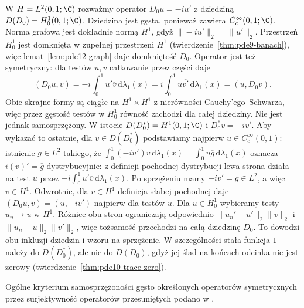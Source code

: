 \begin{przyklad}
\label{ex:pde12-derivative}
W $H=L^2(0,1;\C)$ rozważmy operator $D_0u=-iu'$ z dziedziną
$D(D_0)=H_0^1(0,1;\C)$. Dziedzina jest gęsta, ponieważ
zawiera $C_c^\infty(0,1;\C)$. Norma grafowa jest dokładnie
normą $H^1$, gdyż $\|-iu'\|_2=\|u'\|_2$.
Przestrzeń $H_0^1$ jest domknięta w zupełnej przestrzeni
$H^1$ (twierdzenie~\ref{thm:pde9-banach}), więc
lemat~\ref{lem:pde12-graph} daje domkniętość $D_0$.
Operator jest też symetryczny:
dla testów $u,v$ całkowanie przez części daje
\[
 (D_0u,v)=-i\int_0^1u'\overline v\,\mathrm d\lambda_1(x)
 =i\int_0^1u\overline{v'}\,\mathrm d\lambda_1(x)
 =(u,D_0v).
\]
Obie skrajne formy są ciągłe na $H^1\times H^1$
z nierówności Cauchy'ego--Schwarza, więc przez gęstość
testów w $H_0^1$ równość zachodzi dla całej dziedziny.
Nie jest jednak samosprzężony. W istocie
$D(D_0^*)=H^1(0,1;\C)$ i $D_0^*v=-iv'$.
Aby wykazać to ostatnie, dla $v\in D(D_0^*)$ podstawiamy
najpierw $u\in C_c^\infty(0,1)$: istnienie $g\in L^2$
takiego, że $\int_0^1(-iu')\overline v\,\mathrm d\lambda_1(x)
=\int_0^1u\overline g\,\mathrm d\lambda_1(x)$ oznacza
$i(\overline v)'=\overline g$ dystrybucyjnie: z definicji
pochodnej dystrybucji lewa strona działa na test $u$ przez
$-i\int_0^1u'\overline v\,\mathrm d\lambda_1(x)$.
Po sprzężeniu mamy $-iv'=g\in L^2$, a więc $v\in H^1$.
Odwrotnie, dla $v\in H^1$ definicja słabej pochodnej daje
$(D_0u,v)=(u,-iv')$ najpierw dla testów $u$.
Dla $u\in H_0^1$ wybieramy testy $u_n\to u$ w $H^1$.
Różnice obu stron ograniczają odpowiednio
$\|u_n'-u'\|_2\|v\|_2$ i $\|u_n-u\|_2\|v'\|_2$,
więc tożsamość przechodzi na całą dziedzinę $D_0$.
To dowodzi obu inkluzji dziedzin i wzoru na sprzężenie.
W szczególności stała funkcja $1$ należy do $D(D_0^*)$,
ale nie do $D(D_0)$, gdyż jej ślad na końcach odcinka
nie jest zerowy (twierdzenie~\ref{thm:pde10-trace-zero}).
\end{przyklad}

Ogólne kryterium samosprzężoności gęsto określonych operatorów symetrycznych przez surjektywność operatorów przesuniętych podano w .

